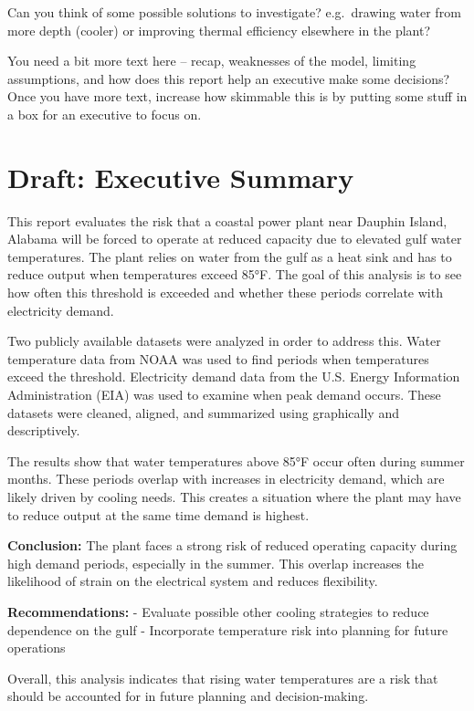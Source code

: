 \documentclass[
  letterpaper,
  DIV=11,
  numbers=noendperiod]{scrreprt}
\begin{document}
\begin{tcolorbox}[enhanced jigsaw, colframe=quarto-callout-note-color-frame, opacityback=0, left=2mm, toprule=.15mm, bottomtitle=1mm, opacitybacktitle=0.6, coltitle=black, leftrule=.75mm, breakable, colback=white, titlerule=0mm, title=\textcolor{quarto-callout-note-color}{\faInfo}\hspace{0.5em}{Note}, arc=.35mm, colbacktitle=quarto-callout-note-color!10!white, toptitle=1mm, bottomrule=.15mm, rightrule=.15mm]

Can you think of some possible solutions to investigate? e.g.~drawing
water from more depth (cooler) or improving thermal efficiency elsewhere
in the plant?

You need a bit more text here -- recap, weaknesses of the model,
limiting assumptions, and how does this report help an executive make
some decisions? Once you have more text, increase how skimmable this is
by putting some stuff in a box for an executive to focus on.

\end{tcolorbox}

\chapter{Draft: Executive Summary}\label{draft-executive-summary}

This report evaluates the risk that a coastal power plant near Dauphin
Island, Alabama will be forced to operate at reduced capacity due to
elevated gulf water temperatures. The plant relies on water from the
gulf as a heat sink and has to reduce output when temperatures exceed
85°F. The goal of this analysis is to see how often this threshold is
exceeded and whether these periods correlate with electricity demand.

Two publicly available datasets were analyzed in order to address this.
Water temperature data from NOAA was used to find periods when
temperatures exceed the threshold. Electricity demand data from the U.S.
Energy Information Administration (EIA) was used to examine when peak
demand occurs. These datasets were cleaned, aligned, and summarized
using graphically and descriptively.

The results show that water temperatures above 85°F occur often during
summer months. These periods overlap with increases in electricity
demand, which are likely driven by cooling needs. This creates a
situation where the plant may have to reduce output at the same time
demand is highest.

\textbf{Conclusion:} The plant faces a strong risk of reduced operating
capacity during high demand periods, especially in the summer. This
overlap increases the likelihood of strain on the electrical system and
reduces flexibility.

\textbf{Recommendations:} - Evaluate possible other cooling strategies
to reduce dependence on the gulf - Incorporate temperature risk into
planning for future operations

Overall, this analysis indicates that rising water temperatures are a
risk that should be accounted for in future planning and
decision-making.
\end{document}
